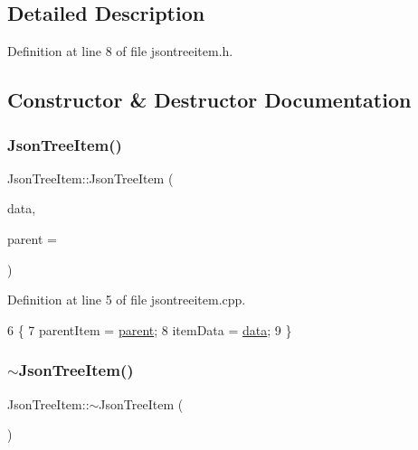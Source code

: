 \subsection{Detailed Description}


Definition at line 8 of file jsontreeitem.\+h.



\subsection{Constructor \& Destructor Documentation}
\mbox{\label{class_json_tree_item_a3a4ebfeec3401b43940cddc8dd644727}} 
\subsubsection{\texorpdfstring{Json\+Tree\+Item()}{JsonTreeItem()}}
{\footnotesize\ttfamily Json\+Tree\+Item\+::\+Json\+Tree\+Item (\begin{DoxyParamCaption}\item[{const Q\+Vector$<$ Q\+Variant $>$ \&}]{data,  }\item[{\hyperlink{class_json_tree_item}{Json\+Tree\+Item} $\ast$}]{parent = {} }\end{DoxyParamCaption})}



Definition at line 5 of file jsontreeitem.\+cpp.


\begin{DoxyCode}
6 \{
7     parentItem = \hyperlink{class_json_tree_item_a1777c30033cacb28a800b34423dcee38}{parent};
8     itemData = \hyperlink{class_json_tree_item_a3cd46e11efb01a8c7f59d6bf3c4582d4}{data};
9 \}
\end{DoxyCode}
\mbox{\label{class_json_tree_item_aac595e07ae4a51106c478e0d99a149e0}} 
\subsubsection{\texorpdfstring{$\sim$\+Json\+Tree\+Item()}{~JsonTreeItem()}}
{\footnotesize\ttfamily Json\+Tree\+Item\+::$\sim$\+Json\+Tree\+Item (\begin{DoxyParamCaption}{ }\end{DoxyParamCaption})}



